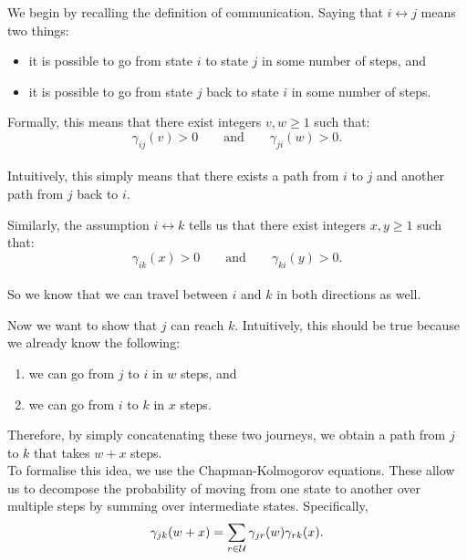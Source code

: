 \documentclass[12pt]{article}
\begin{document}
\vspace{0.3cm}

We begin by recalling the definition of communication. Saying that $i \leftrightarrow j$ means two things:\\

\begin{itemize}
\item it is possible to go from state $i$ to state $j$ in some number of steps, and
\item it is possible to go from state $j$ back to state $i$ in some number of steps.
\end{itemize}

Formally, this means that there exist integers $v,w \geq 1$ such that:\\
\[
\gamma_{ij}(v)>0
\qquad \text{and} \qquad
\gamma_{ji}(w)>0.
\]\\

Intuitively, this simply means that there exists a path from $i$ to $j$ and another path from $j$ back to $i$.\\

\vspace{0.3cm}

Similarly, the assumption $i \leftrightarrow k$ tells us that there exist integers $x,y \geq 1$ such that:\\
\[
\gamma_{ik}(x)>0
\qquad \text{and} \qquad
\gamma_{ki}(y)>0.
\]\\

So we know that we can travel between $i$ and $k$ in both directions as well.\\

\vspace{0.3cm}

Now we want to show that $j$ can reach $k$. Intuitively, this should be true because we already know the following:

\begin{enumerate}
\item we can go from $j$ to $i$ in $w$ steps, and
\item we can go from $i$ to $k$ in $x$ steps.
\end{enumerate}

Therefore, by simply concatenating these two journeys, we obtain a path from $j$ to $k$ that takes $w+x$ steps.\\

To formalise this idea, we use the Chapman-Kolmogorov equations. These allow us to decompose the probability of moving from one state to another over multiple steps by summing over intermediate states. Specifically,\\
\[
\gamma_{jk}(w+x)
=
\sum_{r\in \cal{U}}\gamma_{jr}(w)\gamma_{rk}(x).
\]\\
\end{document}
